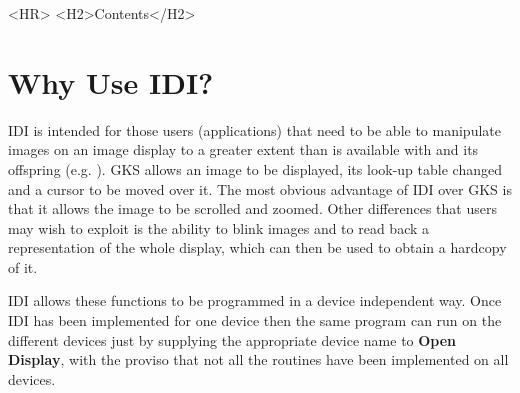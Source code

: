 %
\newcommand{\latexonlytoc}[0]{\tableofcontents}
\begin{htmlonly}
   \renewcommand{\latexonlytoc}[0]{}
  \label{stardoccontents}
  \begin{rawhtml} 
     <HR>
     <H2>Contents</H2>
  \end{rawhtml}
\end{htmlonly}
\begin{latexonly}
   \setlength{\parskip}{0mm}
   \latexonlytoc
   \setlength{\parskip}{\medskipamount}
   \markright{\stardocname}
\end{latexonly}

\newpage

\section{Why Use IDI?}

IDI is intended for those users (applications) that need to be able to
manipulate images on an image display to a greater extent than is
available with  and its offspring (e.g. 
). GKS allows an image to
be displayed, its look-up table changed and a cursor to be moved over it.
The most obvious advantage of IDI over GKS is that it allows the image
to be scrolled and zoomed. Other differences that users may wish to exploit
is the ability to blink images and to read back a representation of
the whole display, which can then be used to obtain a hardcopy of it.

IDI allows these functions to be programmed in a device independent way.
Once IDI has been implemented for one device then the same program can
run on the different devices just by supplying the appropriate device name
to {\bf Open Display}, with the proviso that not all the routines have
been implemented on all devices.


